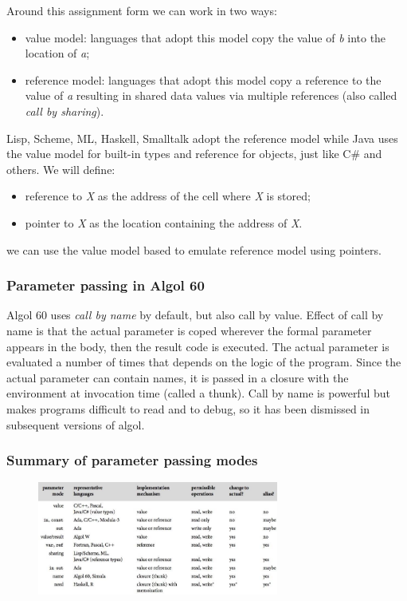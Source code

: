 Around this assignment form we can work in two ways:
\begin{itemize}
    \item value model: languages that adopt this model copy the value of \emph{b} into the location of \emph{a};
    \item reference model: languages that adopt this model copy a reference to the value of \emph{a} resulting in shared data values via multiple references (also called \emph{call by sharing}).
\end{itemize}

Lisp, Scheme, ML, Haskell, Smalltalk adopt the reference model while Java uses the value model for built-in types and reference for objects, just like C\# and others.
We will define:
\begin{itemize}
    \item reference to \emph{X} as the address of the cell where \emph{X} is stored;
    \item pointer to \emph{X} as the location containing the address of \emph{X}.
\end{itemize}
we can use the value model based to emulate reference model using pointers.

\subsubsection{Parameter passing in Algol 60}
Algol 60 uses \emph{call by name} by default, but also call by value.
Effect of call by name is that the actual parameter is coped wherever the formal parameter appears in the body, then the result code is executed.
The actual parameter is evaluated a number of times that depends on the logic of the program.
Since the actual parameter can contain names, it is passed in a closure with the environment at invocation time (called a thunk).
Call by name is powerful but makes programs difficult to read and to debug, so it has been dismissed in subsequent versions of algol.

\subsubsection{Summary of parameter passing modes}
\begin{figure}[H]
    \centering
    \includegraphics[width=300px]{images/7_Functional_Programming/parameter_passing_summary.png}
\end{figure}


